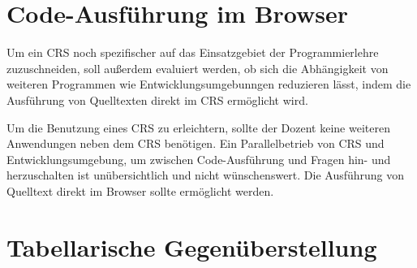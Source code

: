 \section{Code-Ausführung im Browser}
\label{chap:codeausfuehrung}
Um ein CRS noch spezifischer auf das Einsatzgebiet der Programmierlehre zuzuschneiden, soll außerdem evaluiert werden, ob sich die Abhängigkeit von weiteren Programmen wie Entwicklungsumgebunngen reduzieren lässt, indem die Ausführung von Quelltexten direkt im CRS ermöglicht wird.

Um die Benutzung eines CRS zu erleichtern, sollte der Dozent keine weiteren Anwendungen neben dem CRS benötigen. Ein Parallelbetrieb von CRS und Entwicklungsumgebung, um zwischen Code-Ausführung und Fragen hin- und herzuschalten ist unübersichtlich und nicht wünschenswert. Die Ausführung von Quelltext direkt im Browser sollte ermöglicht werden.

\section{Tabellarische Gegenüberstellung}
\label{chap:tabelle}

